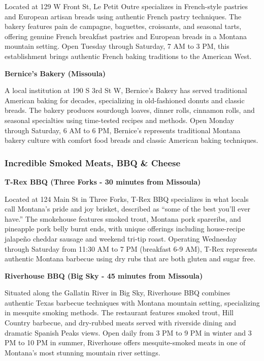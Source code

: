 \documentclass[
  11pt,
  letterpaper,
  DIV=10,
  numbers=noendperiod]{scrartcl}
\begin{document}
Located at 129 W Front St, Le Petit Outre specializes in French-style
pastries and European artisan breads using authentic French pastry
techniques. The bakery features pain de campagne, baguettes, croissants,
and seasonal tarts, offering genuine French breakfast pastries and
European breads in a Montana mountain setting. Open Tuesday through
Saturday, 7 AM to 3 PM, this establishment brings authentic French
baking traditions to the American West.

\textbf{Bernice's Bakery (Missoula)}

A local institution at 190 S 3rd St W, Bernice's Bakery has served
traditional American baking for decades, specializing in old-fashioned
donuts and classic breads. The bakery produces sourdough loaves, dinner
rolls, cinnamon rolls, and seasonal specialties using time-tested
recipes and methods. Open Monday through Saturday, 6 AM to 6 PM,
Bernice's represents traditional Montana bakery culture with comfort
food breads and classic American baking techniques.

\subsubsection{Incredible Smoked Meats, BBQ \&
Cheese}\label{incredible-smoked-meats-bbq-cheese}

\textbf{T-Rex BBQ (Three Forks - 30 minutes from Missoula)}

Located at 124 Main St in Three Forks, T-Rex BBQ specializes in what
locals call Montana's pride and joy brisket, described as ``some of the
best you'll ever have.'' The smokehouse features smoked trout, Montana
pork spareribs, and pineapple pork belly burnt ends, with unique
offerings including house-recipe jalapeño cheddar sausage and weekend
tri-tip roast. Operating Wednesday through Saturday from 11:30 AM to 7
PM (breakfast 6-9 AM), T-Rex represents authentic Montana barbecue using
dry rubs that are both gluten and sugar free.

\textbf{Riverhouse BBQ (Big Sky - 45 minutes from Missoula)}

Situated along the Gallatin River in Big Sky, Riverhouse BBQ combines
authentic Texas barbecue techniques with Montana mountain setting,
specializing in mesquite smoking methods. The restaurant features smoked
trout, Hill Country barbecue, and dry-rubbed meats served with riverside
dining and dramatic Spanish Peaks views. Open daily from 3 PM to 9 PM in
winter and 3 PM to 10 PM in summer, Riverhouse offers mesquite-smoked
meats in one of Montana's most stunning mountain river settings.
\end{document}
